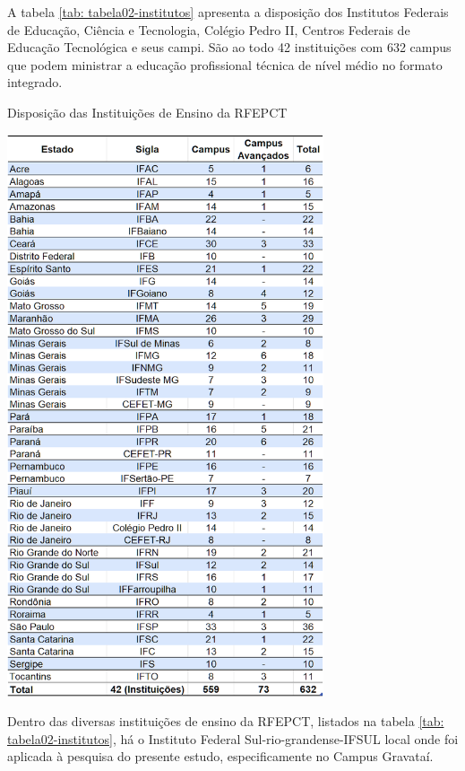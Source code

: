 A tabela \ref{tab: tabela02-institutos} apresenta a disposição dos Institutos Federais de Educação, Ciência e Tecnologia, Colégio Pedro II, Centros Federais de Educação Tecnológica e seus campi. São ao todo 42 instituições com 632 campus que podem ministrar a educação profissional técnica de nível médio no formato integrado.

\newpage
\graphicspath{{tabelas/}}
\begin{table}[!ht]
\centering
\begin{minipage}{1.\textwidth}
\caption{Disposição das Instituições de Ensino da RFEPCT}
\centering
\includegraphics[width=0.7\textwidth]{tabela02-institutos.png}
\label{tab: tabela02-institutos}
\end{minipage}
\end{table}

Dentro das diversas instituições de ensino da RFEPCT, listados na tabela \ref{tab: tabela02-institutos}, há o Instituto Federal Sul-rio-grandense-IFSUL local onde foi aplicada à pesquisa do presente estudo, especificamente no Campus Gravataí.

